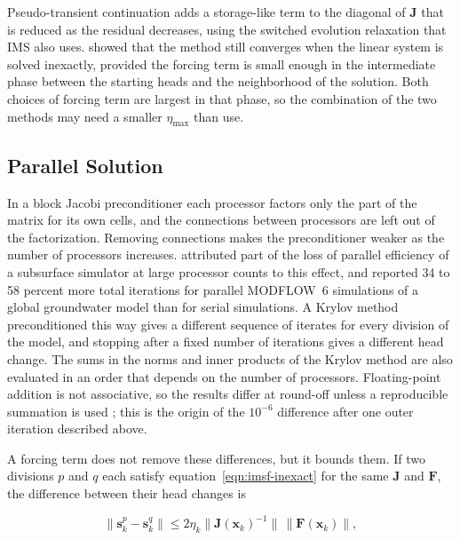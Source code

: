 Pseudo-transient continuation \citep{kelley1998ptc} adds a storage-like term to the diagonal of $\mathbf{J}$ that is reduced as the residual decreases, using the switched evolution relaxation that IMS also uses. \cite{kelley1998ptc} showed that the method still converges when the linear system is solved inexactly, provided the forcing term is small enough in the intermediate phase between the starting heads and the neighborhood of the solution. Both choices of forcing term are largest in that phase, so the combination of the two methods may need a smaller $\eta_{\max}$ than \cite{pernice1998nitsol} use.

\subsection{Parallel Solution}

In a block Jacobi preconditioner each processor factors only the part of the matrix for its own cells, and the connections between processors are left out of the factorization. Removing connections makes the preconditioner weaker as the number of processors increases. \cite{hammond2014evaluating} attributed part of the loss of parallel efficiency of a subsurface simulator at large processor counts to this effect, and \cite{verkaik2024globgm} reported 34 to 58 percent more total iterations for parallel MODFLOW~6 simulations of a global groundwater model than for serial simulations. A Krylov method preconditioned this way gives a different sequence of iterates for every division of the model, and stopping after a fixed number of iterations gives a different head change. The sums in the norms and inner products of the Krylov method are also evaluated in an order that depends on the number of processors. Floating-point addition is not associative, so the results differ at round-off unless a reproducible summation is used \citep{demmel2016reproducible}; this is the origin of the $10^{-6}$ difference after one outer iteration described above.

A forcing term does not remove these differences, but it bounds them. If two divisions $p$ and $q$ each satisfy equation~\ref{eqn:imsf-inexact} for the same $\mathbf{J}$ and $\mathbf{F}$, the difference between their head changes is

\begin{equation}
	\label{eqn:imsf-bound}
	\| \mathbf{s}_k^{p} - \mathbf{s}_k^{q} \| \le 2 \eta_k \| \mathbf{J}(\mathbf{x}_k)^{-1} \| \, \| \mathbf{F}(\mathbf{x}_k) \| ,
\end{equation}

